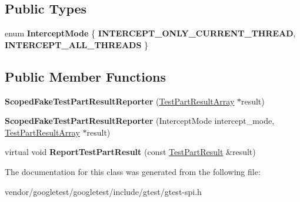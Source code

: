 \subsection*{Public Types}
\begin{DoxyCompactItemize}
\item 
enum {\bfseries Intercept\+Mode} \{ {\bfseries I\+N\+T\+E\+R\+C\+E\+P\+T\+\_\+\+O\+N\+L\+Y\+\_\+\+C\+U\+R\+R\+E\+N\+T\+\_\+\+T\+H\+R\+E\+AD}, 
{\bfseries I\+N\+T\+E\+R\+C\+E\+P\+T\+\_\+\+A\+L\+L\+\_\+\+T\+H\+R\+E\+A\+DS}
 \}\hypertarget{classtesting_1_1ScopedFakeTestPartResultReporter_a82f6209b3cf5c4b15ec8bd8041dbc2d5}{}\label{classtesting_1_1ScopedFakeTestPartResultReporter_a82f6209b3cf5c4b15ec8bd8041dbc2d5}

\end{DoxyCompactItemize}
\subsection*{Public Member Functions}
\begin{DoxyCompactItemize}
\item 
{\bfseries Scoped\+Fake\+Test\+Part\+Result\+Reporter} (\hyperlink{classtesting_1_1TestPartResultArray}{Test\+Part\+Result\+Array} $\ast$result)\hypertarget{classtesting_1_1ScopedFakeTestPartResultReporter_aa0100ecf4799fb51d45167be6a5de1d5}{}\label{classtesting_1_1ScopedFakeTestPartResultReporter_aa0100ecf4799fb51d45167be6a5de1d5}

\item 
{\bfseries Scoped\+Fake\+Test\+Part\+Result\+Reporter} (Intercept\+Mode intercept\+\_\+mode, \hyperlink{classtesting_1_1TestPartResultArray}{Test\+Part\+Result\+Array} $\ast$result)\hypertarget{classtesting_1_1ScopedFakeTestPartResultReporter_a57cbc09ed48627c8a73e622618dc4b4f}{}\label{classtesting_1_1ScopedFakeTestPartResultReporter_a57cbc09ed48627c8a73e622618dc4b4f}

\item 
virtual void {\bfseries Report\+Test\+Part\+Result} (const \hyperlink{classtesting_1_1TestPartResult}{Test\+Part\+Result} \&result)\hypertarget{classtesting_1_1ScopedFakeTestPartResultReporter_a3bc6cb939cbc3db71ece8846e6bafe00}{}\label{classtesting_1_1ScopedFakeTestPartResultReporter_a3bc6cb939cbc3db71ece8846e6bafe00}

\end{DoxyCompactItemize}


The documentation for this class was generated from the following file\+:\begin{DoxyCompactItemize}
\item 
vendor/googletest/googletest/include/gtest/gtest-\/spi.\+h\end{DoxyCompactItemize}
